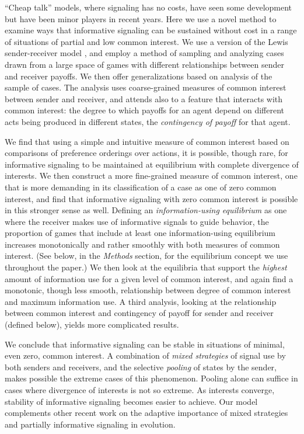 \documentclass[10pt]{article}
\begin{document}
``Cheap talk'' models, where signaling has no costs, have seen some
development
\cite{Crawford1982, Farrell1996, Bergstrom1998, Silk2000, Bradbury2000, Wagner2012}
but have been minor players in recent years. Here we use a novel method
to examine ways that informative signaling can be sustained without cost
in a range of situations of partial and low common interest. We use a
version of the Lewis sender-receiver model
\cite{Lewis1969, Skyrms2010}, and employ a method of sampling and
analyzing cases drawn from a large space of games with different
relationships between sender and receiver payoffs. We then offer
generalizations based on analysis of the sample of cases. The analysis
uses coarse-grained measures of common interest between sender and
receiver, and attends also to a feature that interacts with common
interest: the degree to which payoffs for an agent depend on different
acts being produced in different states, the \emph{contingency of
payoff} for that agent.

We find that using a simple and intuitive measure of common interest
based on comparisons of preference orderings over actions, it is
possible, though rare, for informative signaling to be maintained at
equilibrium with complete divergence of interests. We then construct a
more fine-grained measure of common interest, one that is more demanding
in its classification of a case as one of zero common interest, and find
that informative signaling with zero common interest is possible in this
stronger sense as well. Defining an \emph{information-using equilibrium}
as one where the receiver makes use of informative signals to guide
behavior, the proportion of games that include at least one
information-using equilibrium increases monotonically and rather
smoothly with both measures of common interest. (See below, in the \emph{Methods} section, for the equilibrium concept we use throughout the paper.) We then look at the
equilibria that support the \emph{highest} amount of information use for
a given level of common interest, and again find a monotonic, though
less smooth, relationship between degree of common interest and maximum
information use. A third analysis, looking at the relationship between
common interest and contingency of payoff for sender and receiver
(defined below), yields more complicated results.

We conclude that informative signaling can be stable in situations of
minimal, even zero, common interest. A combination of \emph{mixed
strategies} of signal use by both senders and receivers, and the
selective \emph{pooling} of states by the sender, makes possible the
extreme cases of this phenomenon. Pooling alone can suffice in cases
where divergence of interests is not so extreme. As interests converge,
stability of informative signaling becomes easier to achieve. Our model
complements other recent work on the adaptive importance of mixed
strategies and partially informative signaling in evolution.
\end{document}
